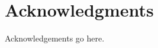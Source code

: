 

\vspace*{\fill}

\section*{Acknowledgments}
\label{acknowledgments}

Acknowledgements go here.


\vspace*{\fill}
